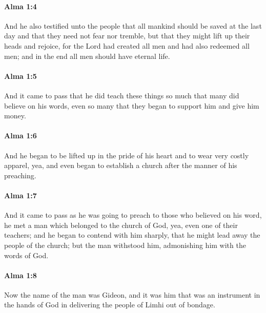 		\paragraph{Alma 1:4} %
			\label{ALMA-1-4}

			And he also testified unto the people
			that all mankind should be saved at the last day
			and that they need not fear nor tremble,
			but that they might lift up their heads and rejoice,
			for the Lord had created all men and had also redeemed all men;
			and in the end all men should have eternal life.

		\paragraph{Alma 1:5} %
			\label{ALMA-1-5}

			And it came to pass that he did teach these things so much
			that many did believe on his words,
			even so many that they began to support him and give him money.

		\paragraph{Alma 1:6} %
			\label{ALMA-1-6}

			And he began to be lifted up in the pride of his heart
			and to wear very costly apparel,
			yea, and even began to establish a church after the manner of his preaching.

		\paragraph{Alma 1:7} %
			\label{ALMA-1-7}

			And it came to pass
			as he was going to preach to those who believed on his word,
			he met a man which belonged to the church of God,
			yea, even one of their teachers;
			and he began to contend with him sharply,
			that he might lead away the people of the church;
			but the man withstood him,
			admonishing him with the words of God.

		\paragraph{Alma 1:8} %
			\label{ALMA-1-8}

			Now the name of the man was Gideon,
			and it was him that was an instrument in the hands of God
			in delivering the people of Limhi out of bondage.

